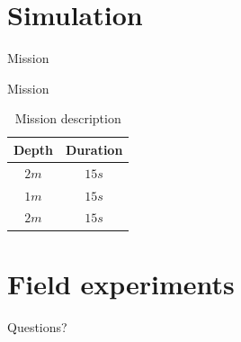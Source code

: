 \documentclass[10pt, xcolor={usenames, dvipsnames}]{beamer}
\begin{document}
    \section{Simulation}

        \begin{frame}{Mission}
            \begin{minipage}{0.45\textwidth}
                \begin{block}{Mission}
                    \begin{table}
                        \begin{tabular}[t]{cc}
                            \toprule
                            Depth & Duration \\
                            \midrule
                            $2m$ & $15s$\\
                            $1m$ & $15s$\\
                            $2m$ & $15s$\\
                            \bottomrule
                        \end{tabular}
                        \caption{Mission description}
                    \end{table}
                \end{block}
            \end{minipage}
        \end{frame}

    \section{Field experiments}


    \appendix

        \begin{frame}[standout]
            Questions?
        \end{frame}
\end{document}
